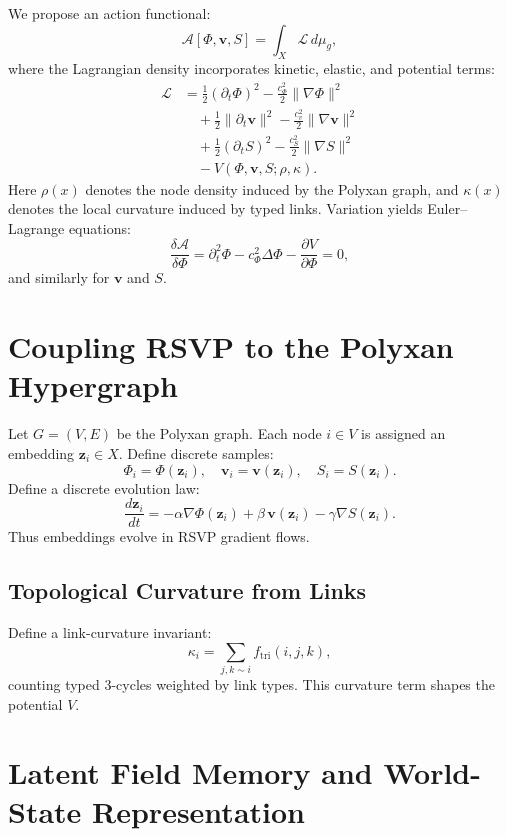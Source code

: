 \documentclass[11pt]{article}
\begin{document}
We propose an action functional:
\[
\mathcal{A}[\Phi,\mathbf{v},S]
= \int_X \mathcal{L}\, d\mu_g,
\]
where the Lagrangian density incorporates kinetic, elastic, and potential
terms:
\begin{align*}
\mathcal{L}
&= \frac{1}{2}(\partial_t\Phi)^2
 - \frac{c_\Phi^2}{2}\|\nabla\Phi\|^2 \\
&\quad + \frac{1}{2}\|\partial_t \mathbf{v}\|^2
 - \frac{c_v^2}{2}\|\nabla\mathbf{v}\|^2 \\
&\quad + \frac{1}{2}(\partial_t S)^2
 - \frac{c_S^2}{2}\|\nabla S\|^2 \\
&\quad - V(\Phi,\mathbf{v},S; \rho, \kappa).
\end{align*}
Here $\rho(x)$ denotes the node density induced by the Polyxan graph, and
$\kappa(x)$ denotes the local curvature induced by typed links.
Variation yields Euler--Lagrange equations:
\[
\frac{\delta \mathcal{A}}{\delta \Phi}
= \partial_t^2\Phi - c_\Phi^2\Delta \Phi
  - \frac{\partial V}{\partial\Phi} = 0,
\]
and similarly for $\mathbf{v}$ and $S$.

\section{Coupling RSVP to the Polyxan Hypergraph}

Let $G=(V,E)$ be the Polyxan graph.
Each node $i\in V$ is assigned an embedding $\mathbf{z}_i\in X$.
Define discrete samples:
\[
\Phi_i = \Phi(\mathbf{z}_i),\quad
\mathbf{v}_i = \mathbf{v}(\mathbf{z}_i),\quad
S_i = S(\mathbf{z}_i).
\]
Define a discrete evolution law:
\[
\frac{d\mathbf{z}_i}{dt}
= -\alpha \nabla \Phi(\mathbf{z}_i)
+ \beta\, \mathbf{v}(\mathbf{z}_i)
- \gamma \nabla S(\mathbf{z}_i).
\]
Thus embeddings evolve in RSVP gradient flows.

\subsection{Topological Curvature from Links}

Define a link-curvature invariant:
\[
\kappa_i = \sum_{j,k \sim i} f_{\text{tri}}(i,j,k),
\]
counting typed 3-cycles weighted by link types.
This curvature term shapes the potential $V$.

\section{Latent Field Memory and World-State Representation}
\end{document}
